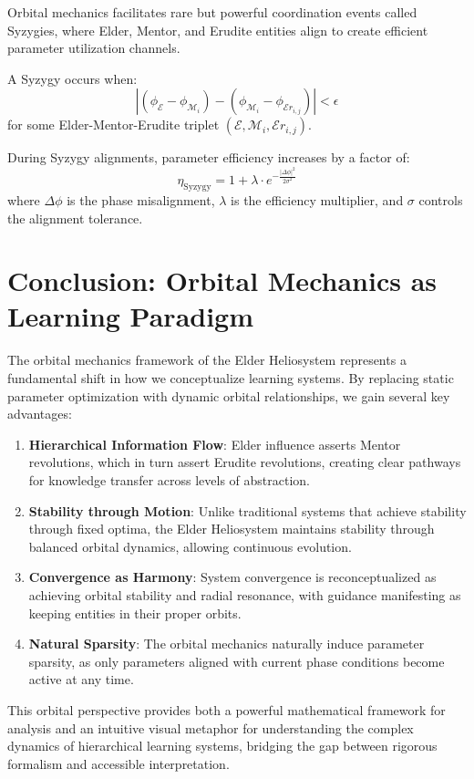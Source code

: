 Orbital mechanics facilitates rare but powerful coordination events called Syzygies, where Elder, Mentor, and Erudite entities align to create efficient parameter utilization channels.

\begin{definition}
A Syzygy occurs when:
\begin{equation}
|(\phi_{\mathcal{E}} - \phi_{\mathcal{M}_i}) - (\phi_{\mathcal{M}_i} - \phi_{\mathcal{E}r_{i,j}})| < \epsilon
\end{equation}
for some Elder-Mentor-Erudite triplet $(\mathcal{E}, \mathcal{M}_i, \mathcal{E}r_{i,j})$.
\end{definition}

\begin{theorem}
During Syzygy alignments, parameter efficiency increases by a factor of:
\begin{equation}
\eta_{\text{Syzygy}} = 1 + \lambda \cdot e^{-\frac{|\Delta\phi|^2}{2\sigma^2}}
\end{equation}
where $\Delta\phi$ is the phase misalignment, $\lambda$ is the efficiency multiplier, and $\sigma$ controls the alignment tolerance.
\end{theorem}

\section{Conclusion: Orbital Mechanics as Learning Paradigm}

The orbital mechanics framework of the Elder Heliosystem represents a fundamental shift in how we conceptualize learning systems. By replacing static parameter optimization with dynamic orbital relationships, we gain several key advantages:

\begin{enumerate}
    \item \textbf{Hierarchical Information Flow}: Elder influence asserts Mentor revolutions, which in turn assert Erudite revolutions, creating clear pathways for knowledge transfer across levels of abstraction.
    
    \item \textbf{Stability through Motion}: Unlike traditional systems that achieve stability through fixed optima, the Elder Heliosystem maintains stability through balanced orbital dynamics, allowing continuous evolution.
    
    \item \textbf{Convergence as Harmony}: System convergence is reconceptualized as achieving orbital stability and radial resonance, with guidance manifesting as keeping entities in their proper orbits.
    
    \item \textbf{Natural Sparsity}: The orbital mechanics naturally induce parameter sparsity, as only parameters aligned with current phase conditions become active at any time.
\end{enumerate}

This orbital perspective provides both a powerful mathematical framework for analysis and an intuitive visual metaphor for understanding the complex dynamics of hierarchical learning systems, bridging the gap between rigorous formalism and accessible interpretation.